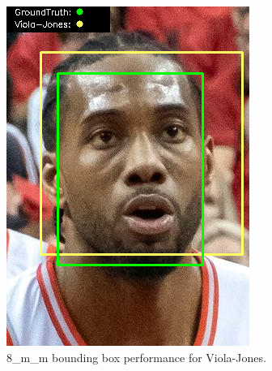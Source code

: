 \documentclass{l4proj}
\begin{document}
\begin{appendices}
\begin{figure}[h!]
  \centering
  \begin{minipage}{0.49\textwidth}
    \centering
     \includegraphics[width=\textwidth]{images/appendix/viola/8.png}
    \caption{8\_m\_m bounding box performance for Viola-Jones.}
    \label{whoopi_result}
  \end{minipage}
    \hfill
    \begin{minipage}{0.49\textwidth}
    \centering

\end{minipage}
\end{figure}
\end{appendices}
\end{document}

